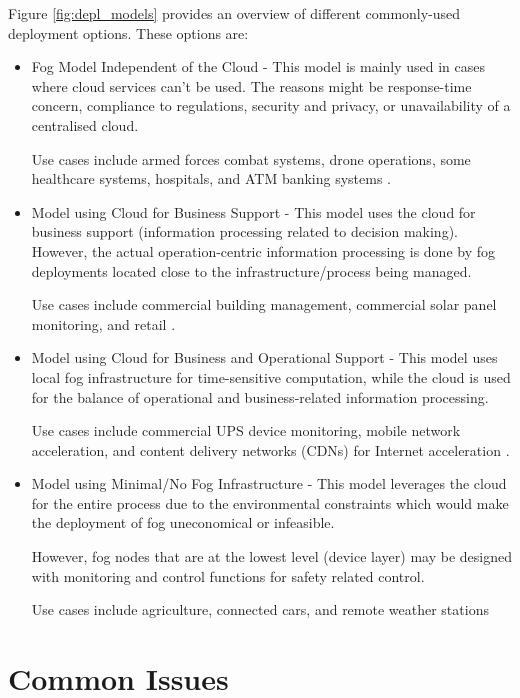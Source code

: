 \documentclass{article}
\begin{document}
Figure \ref{fig:depl_models} provides an overview of different commonly-used deployment options. These options are:

\begin{itemize}
	\item Fog Model Independent of the Cloud - This model is mainly used in cases where cloud services can't be used. The reasons might be response-time concern, compliance to regulations, security and privacy, or unavailability of a centralised cloud.
	
	Use cases include armed forces combat systems, drone operations, some healthcare systems, hospitals, and ATM banking systems \cite{openfogconsortium2017}.

	\item Model using Cloud for Business Support - This model uses the cloud for business support (information processing related to decision making).  However, the actual operation-centric information processing is done by fog deployments located close to the infrastructure/process being managed.

	Use cases include commercial building management, commercial solar panel monitoring, and retail \cite{openfogconsortium2017}.

	\item Model using Cloud for Business and Operational Support - This model uses local fog infrastructure for time-sensitive computation, while the cloud is used for the balance of operational and business-related information processing.

	Use cases include commercial UPS device monitoring, mobile network acceleration, and content delivery networks (CDNs) for Internet acceleration \cite{openfogconsortium2017}.

	\item Model using Minimal/No Fog Infrastructure - This model leverages the cloud for the entire process due to the environmental constraints which would make the deployment of fog uneconomical or infeasible.

	However, fog nodes that are at the lowest level (device layer) may be designed with monitoring and control functions for safety related control.

	Use cases include agriculture, connected cars, and remote weather stations \cite{openfogconsortium2017}
\end{itemize}


\pagebreak

\section{Common Issues}
\end{document}
